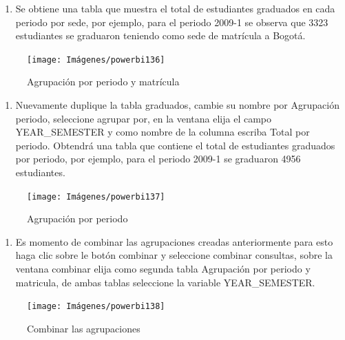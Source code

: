 \documentclass[
]{book}
\providecommand{\tightlist}{%
  \setlength{\itemsep}{0pt}\setlength{\parskip}{0pt}}
\begin{document}
\begin{enumerate}
\def\labelenumi{\arabic{enumi}.}
\setcounter{enumi}{3}
\tightlist
\item
  Se obtiene una tabla que muestra el total de estudiantes graduados en cada periodo por sede, por ejemplo, para el periodo 2009-1 se observa que 3323 estudiantes se graduaron teniendo como sede de matrícula a Bogotá.
\end{enumerate}

\begin{figure}

{\centering \texttt{[image: Imágenes/powerbi136]} 

}

\caption{Agrupación por periodo y matrícula}\label{fig:agrpacionporperiodoymatricula-fig}
\end{figure}

\begin{enumerate}
\def\labelenumi{\arabic{enumi}.}
\setcounter{enumi}{4}
\tightlist
\item
  Nuevamente duplique la tabla graduados, cambie su nombre por Agrupación periodo, seleccione agrupar por, en la ventana elija el campo YEAR\_SEMESTER y como nombre de la columna escriba Total por periodo. Obtendrá una tabla que contiene el total de estudiantes graduados por periodo, por ejemplo, para el periodo 2009-1 se graduaron 4956 estudiantes.
\end{enumerate}

\begin{figure}

{\centering \texttt{[image: Imágenes/powerbi137]} 

}

\caption{Agrupación por periodo}\label{fig:agruparporperiodoa-fig}
\end{figure}

\begin{enumerate}
\def\labelenumi{\arabic{enumi}.}
\setcounter{enumi}{5}
\tightlist
\item
  Es momento de combinar las agrupaciones creadas anteriormente para esto haga clic sobre le botón combinar y seleccione combinar consultas, sobre la ventana combinar elija como segunda tabla Agrupación por periodo y matricula, de ambas tablas seleccione la variable YEAR\_SEMESTER.
\end{enumerate}

\begin{figure}

{\centering \texttt{[image: Imágenes/powerbi138]} 

}

\caption{Combinar las agrupaciones}\label{fig:combinaragrupaciones-fig}
\end{figure}
\end{document}
